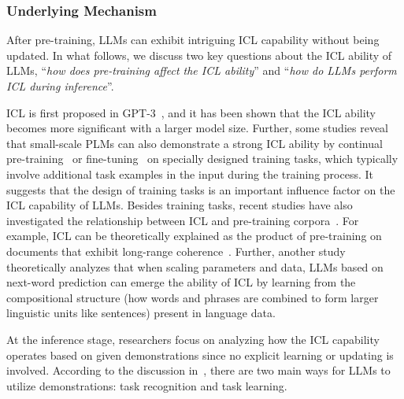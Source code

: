 \subsubsection{Underlying Mechanism}
\label{sec-ICL-mechanism}
After pre-training, LLMs can exhibit intriguing ICL capability without being updated.  
In what follows, we discuss two key questions about the ICL ability of LLMs, \ie ``\emph{how does pre-training affect the ICL ability}'' and ``\emph{how do LLMs perform ICL during inference}''.

ICL is first proposed in GPT-3~\cite{Brown-NeurIPS-2020-Language}, and it has been shown that the ICL ability becomes more significant with a larger model size.
Further, some studies reveal that small-scale PLMs can also demonstrate a strong ICL ability by continual pre-training~\cite{Gu-arXiv-2023-Pre} or fine-tuning~\cite{Min-NAACL-2022-MetaICL} on specially designed training tasks, which typically involve additional task examples in the input during the training process.
It suggests that the design of training tasks is an important influence factor on the ICL capability of LLMs. 
Besides training tasks, recent studies have also investigated the relationship between ICL and pre-training corpora~\cite{Michael-ICLR-2022-An, Hahn-2023-arXiv-a}.
For example, ICL can be theoretically explained as the product of pre-training on documents that exhibit long-range coherence~\cite{Michael-ICLR-2022-An}. 
{
Further, another study~\cite{Hahn-2023-arXiv-a} theoretically analyzes  that when scaling parameters and data, LLMs based on next-word prediction can emerge the ability of ICL by learning from the compositional structure (\eg how words and phrases are combined to form larger linguistic units like sentences) present in language data.  %
}

At the inference stage, researchers focus on analyzing how the ICL capability operates based on given demonstrations since no explicit learning or updating is involved.
According to the discussion in~\cite{Pan-2023-arXiv-what}, there are two main ways for LLMs to utilize demonstrations: task recognition and task learning.  

